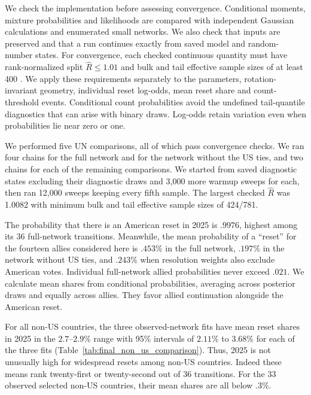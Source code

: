 \documentclass[10pt,authoryear]{elsarticle}
\begin{document}
We check the implementation before assessing convergence. Conditional moments, mixture probabilities and likelihoods are compared with independent Gaussian calculations and enumerated small networks. We also check that inputs are preserved and that a run continues exactly from saved model and random-number states. For convergence, each checked continuous quantity must have rank-normalized split $\widehat R\leq1.01$ and bulk and tail effective sample sizes of at least 400 \citep{vehtari:etal:2021}. We apply these requirements separately to the parameters, rotation-invariant geometry, individual reset log-odds, mean reset share and count-threshold events. Conditional count probabilities avoid the undefined tail-quantile diagnostics that can arise with binary draws. Log-odds retain variation even when probabilities lie near zero or one.

We performed five UN comparisons, all of which pass convergence checks. We ran four chains for the full network and for the network without the US ties, and two chains for each of the remaining comparisons. We started from saved diagnostic states excluding their diagnostic draws and 3,000 more warmup sweeps for each, then ran 12,000 sweeps keeping every fifth sample. The largest checked $\widehat R$ was 1.0082 with minimum bulk and tail effective sample sizes of 424/781.

The probability that there is an American reset in 2025 is $.9976$, highest among its 36 full-network transitions. Meanwhile, the mean probability of a “reset” for the fourteen allies considered here is $.453\%$ in the full network, $.197\%$ in the network without US ties, and $.243\%$ when resolution weights also exclude American votes. Individual full-network allied probabilities never exceed $.021$. We calculate mean shares from conditional probabilities, averaging across posterior draws and equally across allies. They favor allied continuation alongside the American reset.

For all non-US countries, the three observed-network fits have mean reset shares in 2025 in the $2.7$--$2.9\%$ range with 95\% intervals of $2.11\%$ to $3.68\%$ for each of the three fits (Table~\ref{tab:final_non_us_comparison}). Thus, 2025 is not unusually high for widespread resets among non-US countries. Indeed these means rank twenty-first or twenty-second out of 36 transitions. For the 33 observed selected non-US countries, their mean shares are all below $.3\%$.
\end{document}
